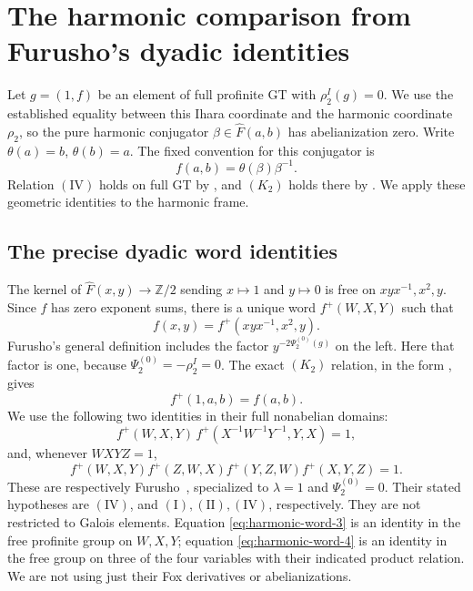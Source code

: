 \section{The harmonic comparison from Furusho's dyadic identities}
\label{sec:harmonic-dyadic-comparison}

Let $g=(1,f)$ be an element of full profinite $\mathrm{GT}$ with
$\rho_2^I(g)=0$.  We use the established equality between this
Ihara coordinate and the harmonic coordinate $\rho_2$, so the
pure harmonic conjugator $\beta\in\widehat F(a,b)$ has
abelianization zero.  Write $\theta(a)=b$, $\theta(b)=a$.
The fixed convention for this conjugator is
\begin{equation}\label{eq:harmonic-word-H}
f(a,b)=\theta(\beta)\beta^{-1}.
\end{equation}
Relation $(\mathrm{IV})$ holds on full GT by
\cite[Theorem~1]{H17}, and $(K_2)$ holds there by
\cite[Theorem~8.1]{Enriquez2007}. We apply these geometric
identities to the harmonic frame.

\subsection{The precise dyadic word identities}

The kernel of $\widehat F(x,y)\to\mathbb Z/2$ sending
$x\mapsto1$ and $y\mapsto0$ is free on $xyx^{-1},x^2,y$.  Since $f$ has zero
exponent sums, there is a unique word $f^+(W,X,Y)$ such that
\begin{equation}\label{eq:harmonic-word-1}
f(x,y)=f^+(xyx^{-1},x^2,y).
\end{equation}
Furusho's general definition includes the factor
$y^{-2\Psi_2^{(0)}(g)}$ on the left.  Here that factor is one,
because $\Psi_2^{(0)}=-\rho_2^I=0$.
The exact $(K_2)$ relation, in the form
\cite[\S3, equation~(2), p.~102]{Furusho2003}, gives
\begin{equation}\label{eq:harmonic-word-2}
f^+(1,a,b)=f(a,b).
\end{equation}
We use the following two identities in their full nonabelian
domains:
\begin{equation}\label{eq:harmonic-word-3}
f^+(W,X,Y)\,
 f^+(X^{-1}W^{-1}Y^{-1},Y,X)=1,
\end{equation}
and, whenever $WXYZ=1$,
\begin{equation}\label{eq:harmonic-word-4}
f^+(W,X,Y)f^+(Z,W,X)
 f^+(Y,Z,W)f^+(X,Y,Z)=1.
\end{equation}
These are respectively Furusho~\cite[Lemmas 4.1 and 4.2,
pp.~105--106]{Furusho2003}, specialized to
$\lambda=1$ and $\Psi_2^{(0)}=0$.
Their stated hypotheses are $(\mathrm{IV})$, and
$(\mathrm{I}), (\mathrm{II}), (\mathrm{IV})$, respectively.
They are not restricted to Galois elements.  Equation \eqref{eq:harmonic-word-3} is
an identity in the free profinite group on $W,X,Y$; equation
\eqref{eq:harmonic-word-4} is an identity in the free group on three of the four
variables with their indicated product relation.  We are not
using just their Fox derivatives or abelianizations.

